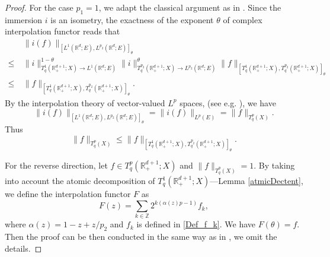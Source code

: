 \documentclass[oneside,english,a4wide]{amsart}
\numberwithin{equation}{section}
\numberwithin{figure}{section}
\theoremstyle{plain}
\theoremstyle{plain}
\theoremstyle{definition}
\theoremstyle{plain}
\theoremstyle{remark}
\theoremstyle{definition}
\theoremstyle{remark}
\theoremstyle{definition}
\newcommand{\real}{{\mathbb R}}
\newcommand{\ent}{{\mathbb Z}}
\newcommand{\8}{+\infty}
\renewcommand{\1}{\mathbbm{1}}
\begin{document}
{\begin{proof}
For the case $p_1 = 1$, we adapt the classical argument as in \cite[Lemma 4, Lemma 5]{Coifman1985}. Since the immersion $i$ is an isometry, the exactness of the exponent $\theta$ of complex interpolation functor reads that
\[
\begin{aligned}
    & \| i(f) \|_{[L^1(\real^d; E), L^{p_2}(\real^d; E)]_\theta} \\
    \leq\ & \| i \|_{T^1_q(\real^{d+1}_+; X) \to L^1(\real^d; E)}^{1- \theta}\| i \|_{T^{p_2}_q(\real^{d+1}_+; X) \to L^{p_2}(\real^d; E)}^{\theta} \| f \|_{[T^1_q(\real^{d+1}_+; X), T^{p_2}_q(\real^{d+1}_+; X)]_\theta} \\
    \leq\ & \| f \|_{[T^1_q(\real^{d+1}_+; X), T^{p_2}_q(\real^{d+1}_+; X)]_\theta}.
\end{aligned}
\]
By the interpolation theory of vector-valued $L^p$ spaces, (see e.g. \cite{Blasco1989}), we have
\[
    \| i(f) \|_{[L^1(\real^d; E), L^{p_2}(\real^d; E)]_\theta} = \| i(f) \|_{L^p(E)} = \| f \|_{T^p_q(X)}.
\]
Thus 
\[
    \| f \|_{T^p_q(X)} \leq \| f \|_{[T^1_q(\real^{d+1}_+; X), T^{p_2}_q(\real^{d+1}_+; X)]_\theta}.
\]

For the reverse direction, let $f \in T^p_q(\real^{d+1}_+; X)$ and $\| f \|_{T^p_q(X)} = 1$. By taking into account the atomic decomposition of $T^1_q(\real^{d+1}_+; X)$---Lemma \ref{atmicDectent}, we define the interpolation functor $F$ as
\[
    F(z) = \sum_{k \in \ent} 2^{k(\alpha(z)p - 1)}f_k,
\]
where $\alpha(z) = 1-z + z/p_2$ and $f_k$ is defined in \eqref{Def_f_k}. We have $F(\theta) = f$. Then the proof can be then conducted in the same way as in \cite[Lemma 5]{Coifman1985}, we omit the details.
\end{proof}

}
\end{document}
